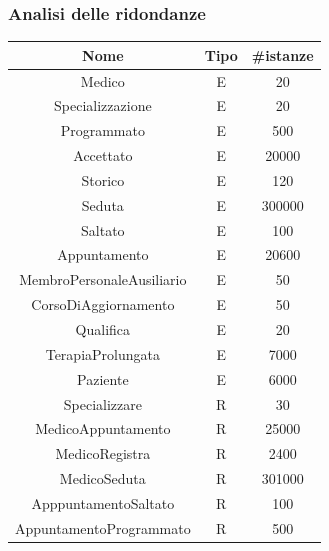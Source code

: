 \documentclass[11pt,a4paper]{article}
\begin{document}
\subsubsection{Analisi delle ridondanze}
\label{er:ridondanze1}
\begin{table}[H]
\begin{tabular}{|c|c|c|}
\hline \textbf{Nome}             & \textbf{Tipo} & \textbf{\#istanze} \\
\hline Medico                    & E             & 20                 \\
\hline Specializzazione          & E             & 20                 \\
\hline Programmato               & E             & 500                \\
\hline Accettato                 & E             & 20000              \\
\hline Storico                   & E             & 120                \\
\hline Seduta                    & E             & 300000             \\
\hline Saltato                   & E             & 100                \\
\hline Appuntamento              & E             & 20600              \\
\hline MembroPersonaleAusiliario & E             & 50                 \\
\hline CorsoDiAggiornamento      & E             & 50                 \\
\hline Qualifica                 & E             & 20                 \\
\hline TerapiaProlungata         & E             & 7000               \\
\hline Paziente                  & E             & 6000               \\
\hline Specializzare             & R             & 30                 \\
\hline MedicoAppuntamento        & R             & 25000              \\
\hline MedicoRegistra            & R             & 2400               \\
\hline MedicoSeduta              & R             & 301000             \\
\hline ApppuntamentoSaltato      & R             & 100                \\
\hline AppuntamentoProgrammato   & R             & 500                \\

\end{tabular}
\end{table}
\end{document}
